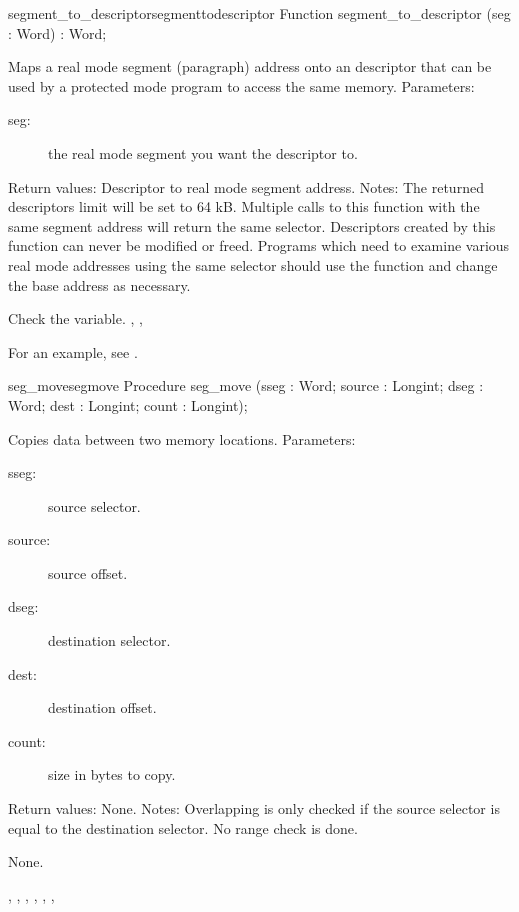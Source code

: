 \begin{functionl}{segment\_to\_descriptor}{segmenttodescriptor}
\Declaration
Function segment\_to\_descriptor (seg : Word) : Word;

\Description

Maps a real mode segment (paragraph) address onto an descriptor that can be
used by a protected mode program to access the same memory.
Parameters: 
\begin{description}
\item [seg:\ ] the real mode segment you want the descriptor to.
\end{description}
Return values: Descriptor to real mode segment address.
Notes: The returned descriptors limit will be set to 64 kB. Multiple calls
to this function with the same segment address will return the same
selector. Descriptors created by this function can never be modified or
freed. Programs which need to examine various real mode addresses using the
same selector should use the function 
 and change
the base address as necessary.

\Errors
 Check the  variable. 
\SeeAlso
{},
,

\end{functionl}
For an example, see .
\begin{procedurel}{seg\_move}{segmove}
\Declaration
Procedure seg\_move (sseg : Word; source : Longint; dseg : Word; dest :
Longint; count : Longint);

\Description
Copies data between two memory locations.
Parameters: 
\begin{description}
\item[sseg:\ ] source selector. 
\item[source:\ ] source offset. 
\item[dseg:\ ] destination selector.
\item[dest:\ ] destination offset.
\item[count:\ ] size in bytes to copy.
\end{description}
Return values: None.
Notes: Overlapping is only checked if the source selector is equal to the
destination selector. No range check is done.

\Errors
 None.
\SeeAlso
 
,
,
,
,
,
,
\end{procedurel}
